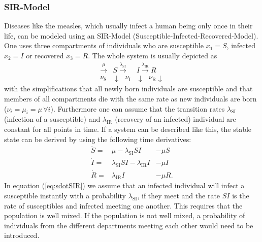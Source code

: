 \subsubsection{SIR-Model}\label{chap:sirBasic}
Diseases like the measles, which usually infect a human being only once in their life, can be modeled using an SIR-Model (Susceptible-Infected-Recovered-Model). One uses three compartments of individuals who are susceptible $x_1 = S$, infected $x_2=I$ or recovered $x_3=R$. The whole system is usually depicted as 
\begin{eqnarray}
\xrightarrow{\mu} &S \xrightarrow{\lambda_\text{SI}} &I  \xrightarrow{\lambda_\text{IR}} R  \\
{\nu_\text{S}} & \downarrow \text{         }\nu_\text{I} &\downarrow \text{  } {\nu_\text{R}} \downarrow \nonumber
\end{eqnarray}
with the simplifications that all newly born individuals are susceptible and that members of all compartments die with the same rate as new individuals are born ($\nu_i = \mu_i = \mu\, \forall i$). Furthermore one can assume that the transition rates $\lambda_\text{SI}$ (infection of a susceptible) and $\lambda_\text{IR}$ (recovery of an infected) individual are constant for all points in time.
If a system can be described like this, the stable state can be derived by using the following time derivatives:
\begin{eqnarray}
\dot{S} =& \mu -\lambda_\text{SI} SI &-  \mu S  \label{eq:sdotSIR}\\ 
\dot{I} =& \lambda_\text{SI} SI - \lambda_\text{IR} I  &-\mu I \\
\dot{R} =& \lambda_\text{IR} I & -\mu R. \label{eq:rdotsir}
\end{eqnarray}
In equation (\ref{eq:sdotSIR}) we assume that an infected individual will infect a susceptible instantly with a probability $\lambda_\text{SI}$, if they meet and the rate $SI$ is the rate of susceptibles and infected meeting one another. This requires that the population is well mixed. If the population is not well mixed, a probability of individuals from the different departments meeting each other would need to be introduced. 

